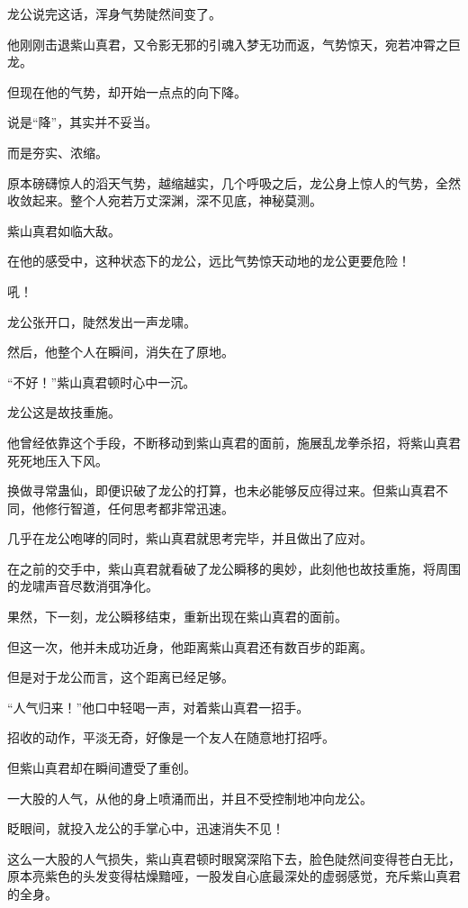 
\begin{this_body}

龙公说完这话，浑身气势陡然间变了。

他刚刚击退紫山真君，又令影无邪的引魂入梦无功而返，气势惊天，宛若冲霄之巨龙。

但现在他的气势，却开始一点点的向下降。

说是“降”，其实并不妥当。

而是夯实、浓缩。

原本磅礴惊人的滔天气势，越缩越实，几个呼吸之后，龙公身上惊人的气势，全然收敛起来。整个人宛若万丈深渊，深不见底，神秘莫测。

紫山真君如临大敌。

在他的感受中，这种状态下的龙公，远比气势惊天动地的龙公更要危险！

吼！

龙公张开口，陡然发出一声龙啸。

然后，他整个人在瞬间，消失在了原地。

“不好！”紫山真君顿时心中一沉。

龙公这是故技重施。

他曾经依靠这个手段，不断移动到紫山真君的面前，施展乱龙拳杀招，将紫山真君死死地压入下风。

换做寻常蛊仙，即便识破了龙公的打算，也未必能够反应得过来。但紫山真君不同，他修行智道，任何思考都非常迅速。

几乎在龙公咆哮的同时，紫山真君就思考完毕，并且做出了应对。

在之前的交手中，紫山真君就看破了龙公瞬移的奥妙，此刻他也故技重施，将周围的龙啸声音尽数消弭净化。

果然，下一刻，龙公瞬移结束，重新出现在紫山真君的面前。

但这一次，他并未成功近身，他距离紫山真君还有数百步的距离。

但是对于龙公而言，这个距离已经足够。

“人气归来！”他口中轻喝一声，对着紫山真君一招手。

招收的动作，平淡无奇，好像是一个友人在随意地打招呼。

但紫山真君却在瞬间遭受了重创。

一大股的人气，从他的身上喷涌而出，并且不受控制地冲向龙公。

眨眼间，就投入龙公的手掌心中，迅速消失不见！

这么一大股的人气损失，紫山真君顿时眼窝深陷下去，脸色陡然间变得苍白无比，原本亮紫色的头发变得枯燥黯哑，一股发自心底最深处的虚弱感觉，充斥紫山真君的全身。


\end{this_body}
